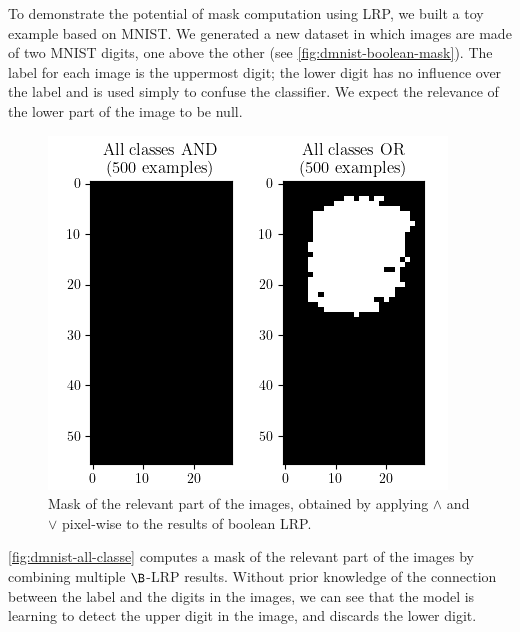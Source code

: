 \documentclass[twocolumn]{../cs-classes/cs-classes}
\newcommand*{\1}{\digitsbb{1}}
\newcommand*{\0}{\digitsbb{0}}
\begin{document}
To demonstrate the potential of mask computation using LRP, we built a toy example based on MNIST. We generated a new dataset in which images are made of two MNIST digits, one above the other (see \autoref{fig:dmnist-boolean-mask}). The label for each image is the uppermost digit; the lower digit has no influence over the label and is used simply to confuse the classifier. We expect the relevance of the lower part of the image to be null.
\begin{figure}[H]
    \centering
    \includegraphics[width=.85\linewidth]{dmnist-all-classes.png}
    \caption{Mask of the relevant part of the images, obtained by applying $\land$ and $\lor$ pixel-wise to the results of boolean LRP.}
    \label{fig:dmnist-all-classe}
\end{figure}
\autoref{fig:dmnist-all-classe} computes  a mask of the relevant part of the images by combining multiple $\B$-LRP results. Without prior knowledge of the connection between the label and the digits in the images, we can see that the model is learning to detect the upper digit in the image, and discards the lower digit.
\end{document}
